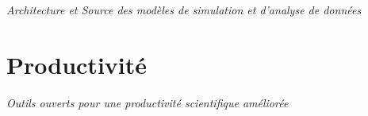 \textit{Architecture et Source des modèles de simulation et d'analyse de données}


\section{Productivité}

\textit{Outils ouverts pour une productivité scientifique améliorée}

















